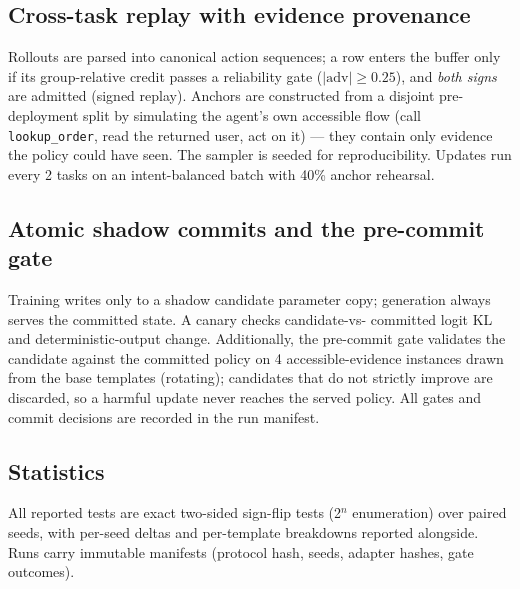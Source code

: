 \subsection{Cross-task replay with evidence provenance}
Rollouts are parsed into canonical action sequences; a row enters the
buffer only if its group-relative credit passes a reliability gate
($|\mathrm{adv}|\ge 0.25$), and \emph{both signs} are admitted (signed
replay). Anchors are constructed from a disjoint pre-deployment split
by simulating the agent's own accessible flow (call
\texttt{lookup\_order}, read the returned user, act on it) --- they
contain only evidence the policy could have seen. The sampler is
seeded for reproducibility. Updates run every 2 tasks on an
intent-balanced batch with 40\% anchor rehearsal.

\subsection{Atomic shadow commits and the pre-commit gate}
Training writes only to a shadow candidate parameter copy; generation
always serves the committed state. A canary checks candidate-vs-
committed logit KL and deterministic-output change. Additionally, the
pre-commit gate validates the candidate against the committed policy
on 4 accessible-evidence instances drawn from the base templates
(rotating); candidates that do not strictly improve are discarded, so
a harmful update never reaches the served policy. All gates and
commit decisions are recorded in the run manifest.

\subsection{Statistics}
All reported tests are exact two-sided sign-flip tests (2$^n$
enumeration) over paired seeds, with per-seed deltas and per-template
breakdowns reported alongside. Runs carry immutable manifests
(protocol hash, seeds, adapter hashes, gate outcomes).
